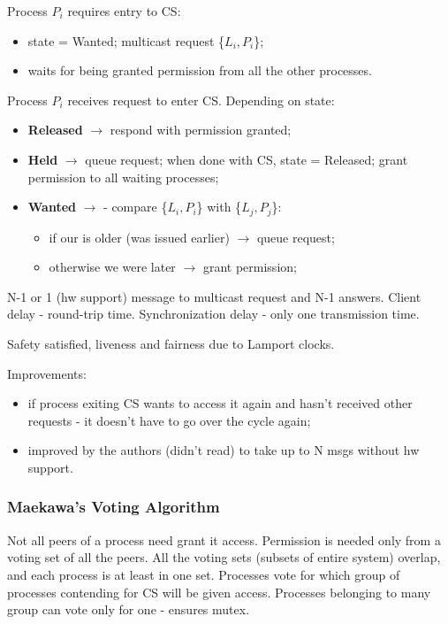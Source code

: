 \documentclass[10pt,a4paper]{article}
\begin{document}
Process $P_i$ requires entry to CS:
\begin{itemize}
	\item state = Wanted; multicast request \{$L_i, P_i$\};
	\item waits for being granted permission from all the other processes.
\end{itemize}

Process $P_i$ receives request to enter CS. Depending on state:
\begin{itemize}
	\item \textbf{Released} $\rightarrow$ respond with permission granted;
	\item \textbf{Held} $\rightarrow$ queue request; when done with CS, state = Released; grant permission to all waiting processes;
	\item \textbf{Wanted} $\rightarrow$ - compare \{$L_i, P_i$\} with \{$L_j, P_j$\}:
		\begin{itemize}
			\item if our is older (was issued earlier) $\rightarrow$ queue request;
			\item otherwise we were later $\rightarrow$ grant permission;
		\end{itemize}
\end{itemize}

N-1 or 1 (hw support) message to multicast request and N-1 answers. Client delay - round-trip time. Synchronization delay - only one transmission time. 

Safety satisfied, liveness and fairness due to Lamport clocks. 

Improvements:
\begin{itemize}
	\item if process exiting CS wants to access it again and hasn't received other requests - it doesn't have to go over the cycle again;
	\item improved by the authors (didn't read) to take up to N msgs without hw support.
\end{itemize}

\subsubsection{Maekawa's Voting Algorithm}
Not all peers of a process need grant it access. Permission is needed only from a voting set of all the peers. All the voting sets (subsets of entire system) overlap, and each process is at least in one set. Processes vote for which group of processes contending for CS will be given access. Processes belonging to many group can vote only for one - ensures mutex.
\end{document}
